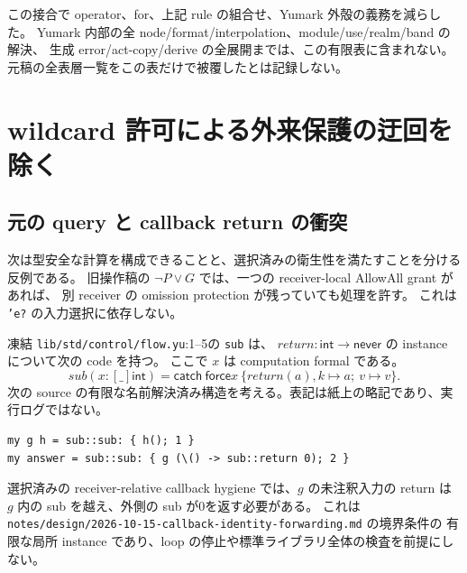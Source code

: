 \documentclass[11pt,a4paper]{article}
\newcommand{\Force}{\mathsf{force}}
\begin{document}
この接合で operator、for、上記 rule の組合せ、Yumark 外殻の義務を減らした。
Yumark 内部の全 node/format/interpolation、module/use/realm/band の解決、
生成 error/act-copy/derive の全展開までは、この有限表に含まれない。
元稿の全表層一覧をこの表だけで被覆したとは記録しない。

\section{wildcard 許可による外来保護の迂回を除く}
\label{sec:wildcard-repair}

\subsection{元の query と callback return の衝突}

次は型安全な計算を構成できることと、選択済みの衛生性を満たすことを分ける反例である。
旧操作稿の \(\neg P\lor G\) では、一つの receiver-local AllowAll grant があれば、
別 receiver の omission protection が残っていても処理を許す。
これは \texttt{'e?} の入力選択に依存しない。

凍結 \nolinkurl{lib/std/control/flow.yu}:1--5の \texttt{sub} は、
\(return:\mathsf{int}\to\mathsf{never}\) の instance について次の code を持つ。
ここで \(x\) は computation formal である。
\[
 sub(x:[\_]\mathsf{int})=
   \mathsf{catch}\ \Force x\ \{return(a),k\mapsto a;\ v\mapsto v\}.
\]
次の source の有限な名前解決済み構造を考える。表記は紙上の略記であり、実行ログではない。
\begin{Verbatim}[fontsize=\small]
my g h = sub::sub: { h(); 1 }
my answer = sub::sub: { g (\() -> sub::return 0); 2 }
\end{Verbatim}
選択済みの receiver-relative callback hygiene では、\(g\) の未注釈入力の return は
\(g\) 内の sub を越え、外側の sub が0を返す必要がある。
これは \nolinkurl{notes/design/2026-10-15-callback-identity-forwarding.md} の境界条件の
有限な局所 instance であり、loop の停止や標準ライブラリ全体の検査を前提にしない。
\end{document}
